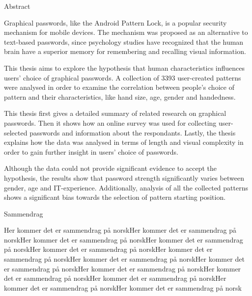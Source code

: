 
{\centering 

	{\Huge Abstract}

	\vspace{1cm}
	
	Graphical passwords, like the Android Pattern Lock, is a popular security mechanism for mobile devices. The mechanism was proposed as an alternative to text-based passwords, since psychology studies have recognized that the human brain have a superior memory for remembering and recalling visual information.

	This thesis aims to explore the hypothesis that human characteristics influences users’ choice of graphical passwords. A collection of 3393 user-created patterns were analysed in order to examine the correlation between people’s choice of pattern and their characteristics, like hand size, age, gender and handedness.

	This thesis first gives a detailed summary of related research on graphical passwords. Then it shows how an online survey was used for collecting user-selected passwords and information about the respondants. Lastly, the thesis explains how the data was analysed in terms of length and visual complexity in order to gain further insight in users’ choice of passwords.

	Although the data could not provide significant evidence to accept the hypothesis, the results show that password strength significantly varies between gender, age and IT-experience. Additionally, analysis of all the collected patterns shows a significant bias towards the selection of pattern starting position.

}

\clearpage


{\centering 

	{\Huge Sammendrag}

	\vspace{1cm}

	Her kommer det er sammendrag på norskHer kommer det er sammendrag på norskHer kommer det er sammendrag på norskHer kommer det er sammendrag på norskHer kommer det er sammendrag på norskHer kommer det er sammendrag på norskHer kommer det er sammendrag på norskHer kommer det er sammendrag på norskHer kommer det er sammendrag på norskHer kommer det er sammendrag på norskHer kommer det er sammendrag på norskHer kommer det er sammendrag på norskHer kommer det er sammendrag på norsk
	
}

	
